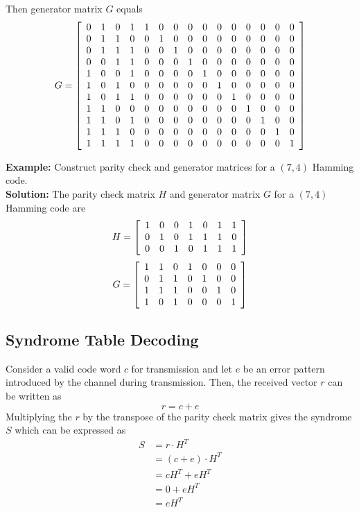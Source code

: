 Then generator matrix $G$ equals
\[
G = \left[ \begin{array}{c c c c c c c c c c c c c c c}
    0&1&0&1&1&0&0&0&0&0&0&0&0&0&0 \\
    0&1&1&0&0&1&0&0&0&0&0&0&0&0&0 \\
    0&1&1&1&0&0&1&0&0&0&0&0&0&0&0 \\
    0&0&1&1&0&0&0&1&0&0&0&0&0&0&0 \\
    1&0&0&1&0&0&0&0&1&0&0&0&0&0&0 \\
    1&0&1&0&0&0&0&0&0&1&0&0&0&0&0 \\ 
    1&0&1&1&0&0&0&0&0&0&1&0&0&0&0 \\
    1&1&0&0&0&0&0&0&0&0&0&1&0&0&0 \\
    1&1&0&1&0&0&0&0&0&0&0&0&1&0&0 \\
    1&1&1&0&0&0&0&0&0&0&0&0&0&1&0 \\
    1&1&1&1&0&0&0&0&0&0&0&0&0&0&1
\end{array} \right]
\]

\textbf{Example:} Construct parity check and generator matrices for a $(7, 4)$ Hamming code. \\
\textbf{Solution:} The parity check matrix $H$ and generator matrix $G$ for a $(7, 4)$ Hamming code are
\[
H = \left[ \begin{array}{c c c c c c c}
    1 & 0 & 0 & 1 & 0 & 1 & 1 \\
    0 & 1 & 0 & 1 & 1 & 1 & 0 \\
    0 & 0 & 1 & 0 & 1 & 1 & 1
\end{array} \right]
\]
\[
G = \left[ \begin{array}{c c c c c c c}
    1 & 1 & 0 & 1 & 0 & 0 & 0 \\
    0 & 1 & 1 & 0 & 1 & 0 & 0 \\
    1 & 1 & 1 & 0 & 0 & 1 & 0 \\
    1 & 0 & 1 & 0 & 0 & 0 & 1
\end{array} \right]
\]

\subsection{Syndrome Table Decoding}
Consider a valid code word $c$ for transmission and let $e$ be an error pattern introduced by the channel during transmission. Then, the received vector $r$ can be written as
\[ r = c + e \]
Multiplying the $r$ by the transpose of the parity check matrix gives the syndrome $S$ which can be expressed as \\
\begin{equation}
    \label{eq:Syndrome Table Decoding}
    \begin{aligned}
        S &= r \cdot H^T \\
        &= (c+e) \cdot H^T \\
        &= cH^T + eH^T\\
        &= 0 + eH^T \\ 
        &= eH^T
    \end{aligned}
\end{equation}

